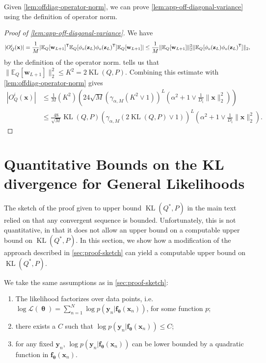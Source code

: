 \documentclass[twoside]{article}
\renewcommand{\ss}[1]{_{\text{#1}}}
\newcommand{\vf}{\mathbf{f}}
\newcommand{\vw}{\mathbf{w}}
\newcommand{\vx}{\mathbf{x}}
\newcommand{\vy}{\mathbf{y}}
\newcommand{\vz}{\mathbf{z}}
\newcommand{\vtheta}{\bm{\uptheta}}
\newcommand{\E}{\mathbb{E}}
\renewcommand{\P}{\mathbb{P}}
\newcommand{\Q}{\mathbb{Q}}
\renewcommand{\Q}{\ensuremath{Q}}
\renewcommand{\P}{\ensuremath{P}}
\newcommand{\T}{\text{\textsf{T}}}
\newcommand{\KL}{\operatorname{KL}}
\renewcommand{\ss}[1]{_{\text{#1}}}        %
\DeclarePairedDelimiter\norm{\|}{\|}             %
\theoremstyle{theoremstyle}
\begin{document}
Given \cref{lem:offdiag-operator-norm}, we can prove \cref{lem:app-off-diagonal-variance} using the definition of operator norm.
\begin{proof}[Proof of \cref{lem:app-off-diagonal-variance}]
We have 
\begin{align}
    |O^i_{\Q}(\vx)| = \frac{1}{M}|\E_{\Q}[\vw_{L+1}]^\T\E_{\Q}[\phi\ss{o}(\vz_{L})\phi\ss{o}(\vz_{L})^\T]\E_{\Q}[\vw_{L+1}]|
    \leq \frac{1}{M}\|\E_{\Q}[\vw_{L+1}]\|_2^2\norm{\E_{\Q}[\phi\ss{o}(\vz_{L})\phi\ss{o}(\vz_{L})^\T]}_2,
\end{align}
by the definition of the operator norm.  tells us that $\|\E_{\Q}[\vw_{L+1}]\|_2^2 \leq K^2 = 2\KL(\Q,\P)$. Combining this estimate with \cref{lem:offdiag-operator-norm} gives
\begin{align}
    |O^i_{\Q}(\vx)| 
    &\leq \tfrac{1}{M} \left(K^2\right) \left(24 \sqrt{M} \left(\gamma_{\alpha,M} (K^2 \lor 1)\right)^{L}\left(\alpha^2 + 1\lor \tfrac1{D\ss{i}}\|\vx\|^2_2\right) \right)\\
    &\leq \tfrac{48}{\sqrt{M}}
    \KL(\Q,\P) \left(\gamma_{\alpha,M} (2\KL(\Q,\P) \lor 1)\right)^{L}\left(\alpha^2 + 1\lor \tfrac1{D\ss{i}}\|\vx\|^2_2\right).
\end{align}
\end{proof}


\section{Quantitative Bounds on the KL divergence for General  Likelihoods}\label{app:kl-bounds}
The sketch of the proof given to upper bound $\KL(\Q^*,\P)$ in the main text relied on that any convergent sequence is bounded. Unfortunately, this is not quantitative, in that it does not allow an upper bound on a computable upper bound on $\KL(\Q^*,\P)$. In this section, we show how a modification of the approach described in \cref{sec:proof-sketch} can yield a computable upper bound on $\KL(\Q^*,\P)$.

We take the same assumptions as in \cref{sec:proof-sketch}:

\begin{enumerate}[label=(\roman*)]\itemsep0pt
   \item The likelihood factorizes over data points, i.e.~$\log \mathcal{L}(\vtheta) = \sum_{n=1}^N \log p(\vy_n | \vf_{\vtheta}(\vx_n))$, for some function $p$;
    \item there exists a $C$ such that $\log p(\vy_n | \vf_{\vtheta}(\vx_n)) \leq C$;
    \item for any fixed $\vy_n$, $\log p(\vy_n | \vf_{\vtheta}(\vx_n))$ can be lower bounded by a quadratic function in $\vf_{\vtheta}(\vx_n)$.
\end{enumerate}
\end{document}

